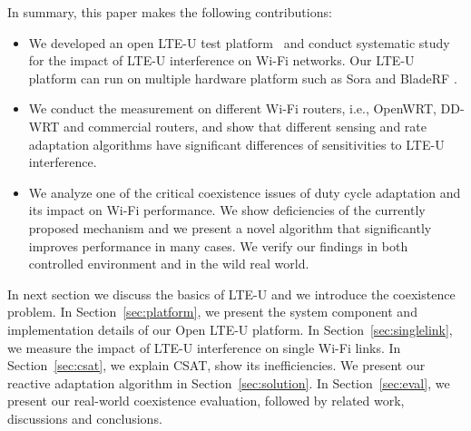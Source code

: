 

In summary, this paper makes the following contributions:
\begin{itemize}
\item We developed an open LTE-U test platform~\cite{OpenLTEU} 
  and conduct systematic study for 
  the impact of LTE-U interference on Wi-Fi networks.
  Our LTE-U platform can run on multiple hardware platform such as 
    Sora \cite{sora} and BladeRF \cite{bladeRF}. 

\item We conduct the measurement on different Wi-Fi routers, 
  i.e., OpenWRT, DD-WRT and commercial routers,
  and show that different sensing and rate adaptation algorithms have 
    significant differences of sensitivities to LTE-U interference.

\item We analyze one of the critical coexistence issues of duty cycle adaptation and its impact on Wi-Fi performance. We show deficiencies of the currently proposed mechanism and we present a novel algorithm that significantly improves performance in many cases. 
We verify our findings in both controlled environment and in the wild real world.

\end{itemize} 



In next section we discuss the basics of LTE-U and we introduce the coexistence problem. 
In Section~\ref{sec:platform}, we present the system component
and implementation details of our Open LTE-U platform.
In Section~\ref{sec:singlelink}, we measure the impact of LTE-U
interference on single Wi-Fi links.
In Section~\ref{sec:csat}, we explain CSAT, show its inefficiencies.
We present our reactive adaptation algorithm in Section~\ref{sec:solution}. 
In Section~\ref{sec:eval}, we present our real-world coexistence evaluation, followed by related work, discussions and conclusions.

